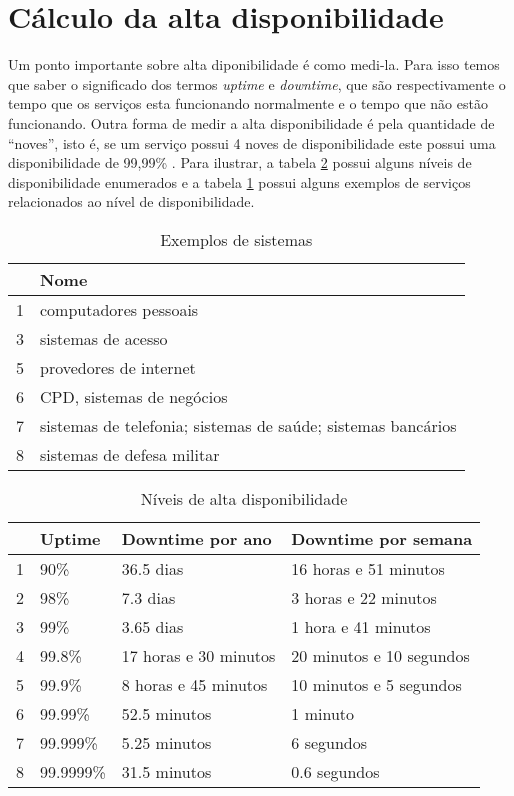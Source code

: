 \section{Cálculo da alta disponibilidade}

Um ponto importante sobre alta diponibilidade é como medi-la. Para isso temos que saber o significado dos termos \textit{uptime} e 
\textit{downtime}, que são respectivamente o tempo que os serviços esta funcionando normalmente e o tempo que não estão funcionando.
Outra forma de medir a alta disponibilidade é pela quantidade de ``noves'', isto é, se um serviço possui 4 noves de disponibilidade
este possui uma disponibilidade de 99,99\% \cite{filho2004}.
Para ilustrar, a tabela \ref{tab:dispniveis} possui alguns níveis de disponibilidade enumerados e a 
tabela \ref{tab:dispexemplos} possui alguns exemplos de serviços relacionados ao nível de disponibilidade.
\begin{table}
\caption {Exemplos de sistemas}
\label{tab:dispexemplos} 
\begin{center}
\begin{tabular}{|l|l|}\hline
  & Nome\\\hline
1 & computadores pessoais\\\hline
3 & sistemas de acesso\\\hline
5 & provedores de internet\\\hline
6 & CPD, sistemas de negócios\\\hline
7 & sistemas de telefonia; sistemas de saúde; sistemas bancários\\\hline
8 & sistemas de defesa militar\\\hline
\end{tabular}
\end{center}
\end{table}

\begin{table}
\caption {Níveis de alta disponibilidade}
\label{tab:dispniveis} 
\begin{center}
\begin{tabular}{|l|l|l|l|}\hline
  & Uptime & Downtime por ano & Downtime por semana\\\hline
1 & 90\% & 36.5 dias & 16 horas e 51 minutos\\\hline
2 & 98\% & 7.3 dias & 3 horas e 22 minutos\\\hline
3 & 99\% & 3.65 dias & 1 hora e 41 minutos\\\hline
4 & 99.8\% & 17 horas e 30 minutos & 20 minutos e 10 segundos\\\hline
5 & 99.9\% & 8 horas e 45 minutos & 10 minutos e 5 segundos\\\hline
6 & 99.99\% & 52.5 minutos & 1 minuto\\\hline
7 & 99.999\% & 5.25 minutos & 6 segundos\\\hline
8 & 99.9999\% & 31.5 minutos & 0.6 segundos\\\hline
\end{tabular}
\end{center}
\end{table}

